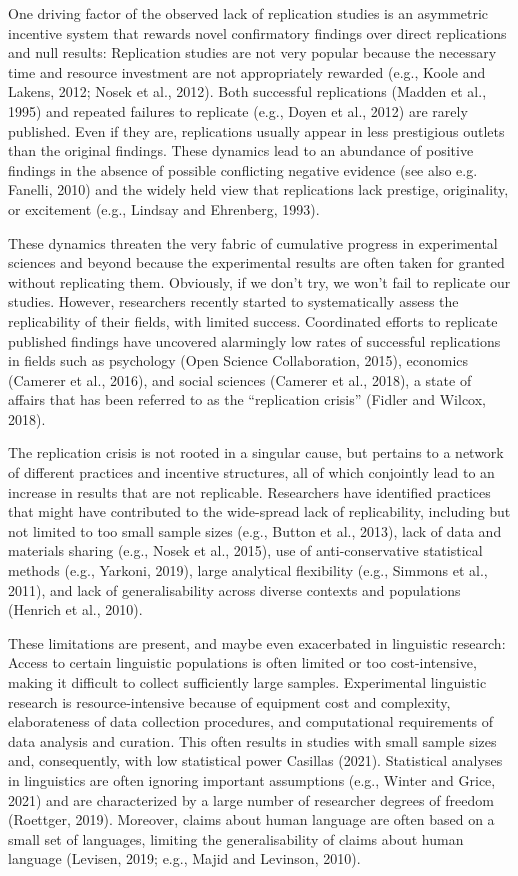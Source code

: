 \documentclass[]{elsarticle} %
\begin{document}
One driving factor of the observed lack of replication studies is an asymmetric incentive system that rewards novel confirmatory findings over direct replications and null results: Replication studies are not very popular because the necessary time and resource investment are not appropriately rewarded (e.g., Koole and Lakens, 2012; Nosek et al., 2012). Both successful replications (Madden et al., 1995) and repeated failures to replicate (e.g., Doyen et al., 2012) are rarely published. Even if they are, replications usually appear in less prestigious outlets than the original findings. These dynamics lead to an abundance of positive findings in the absence of possible conflicting negative evidence (see also e.g. Fanelli, 2010) and the widely held view that replications lack prestige, originality, or excitement (e.g., Lindsay and Ehrenberg, 1993).

These dynamics threaten the very fabric of cumulative progress in experimental sciences and beyond because the experimental results are often taken for granted without replicating them. Obviously, if we don't try, we won't fail to replicate our studies. However, researchers recently started to systematically assess the replicability of their fields, with limited success. Coordinated efforts to replicate published findings have uncovered alarmingly low rates of successful replications in fields such as psychology (Open Science Collaboration, 2015), economics (Camerer et al., 2016), and social sciences (Camerer et al., 2018), a state of affairs that has been referred to as the ``replication crisis'' (Fidler and Wilcox, 2018).

The replication crisis is not rooted in a singular cause, but pertains to a network of different practices and incentive structures, all of which conjointly lead to an increase in results that are not replicable. Researchers have identified practices that might have contributed to the wide-spread lack of replicability, including but not limited to too small sample sizes (e.g., Button et al., 2013), lack of data and materials sharing (e.g., Nosek et al., 2015), use of anti-conservative statistical methods (e.g., Yarkoni, 2019), large analytical flexibility (e.g., Simmons et al., 2011), and lack of generalisability across diverse contexts and populations (Henrich et al., 2010).

These limitations are present, and maybe even exacerbated in linguistic research: Access to certain linguistic populations is often limited or too cost-intensive, making it difficult to collect sufficiently large samples. Experimental linguistic research is resource-intensive because of equipment cost and complexity, elaborateness of data collection procedures, and computational requirements of data analysis and curation. This often results in studies with small sample sizes and, consequently, with low statistical power Casillas (2021). Statistical analyses in linguistics are often ignoring important assumptions (e.g., Winter and Grice, 2021) and are characterized by a large number of researcher degrees of freedom (Roettger, 2019). Moreover, claims about human language are often based on a small set of languages, limiting the generalisability of claims about human language (Levisen, 2019; e.g., Majid and Levinson, 2010).
\end{document}
